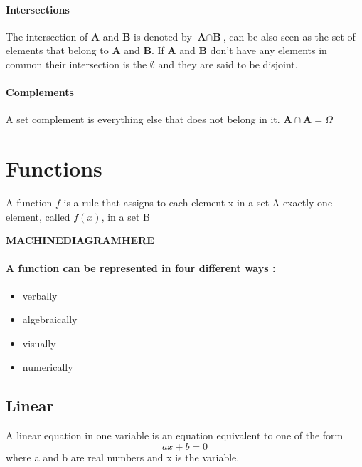 \documentclass[a4paper,11pt]{book}
\begin{document}
\subsubsection{Intersections}
The intersection of \textbf{A} and \textbf{B} is denoted by $\textbf{A} \cap \textbf{B}$, can be also seen as the set of elements that belong to \textbf{A} and \textbf{B}. If \textbf{A} and \textbf{B} don't have any elements in common their intersection is the $\emptyset$ and they are said to be disjoint. 

\subsubsection{Complements}
A set complement is everything else that does not belong in it. $\textbf{A} \cap \textbf{A} = \Omega$


\chapter{Functions}
A function $f$ is a rule that assigns to each element x in a set A exactly one element, called $f(x)$, in a set B

\textbf{MACHINEDIAGRAMHERE}
\subsubsection{A function can be represented in four different ways :}
\begin{itemize}
	\item verbally
	\item algebraically
	\item visually
	\item numerically
\end{itemize}
\section{Linear}
A linear equation in one variable is an equation equivalent to one of the form $$ ax+b=0 $$ where a and b are real numbers and x is the variable.
\end{document}
